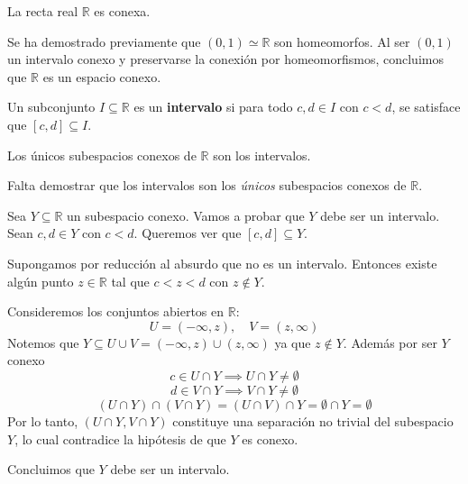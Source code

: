 \begin{teo}
La recta real $\mathbb{R}$ es conexa.
\end{teo}

\begin{dem}
Se ha demostrado previamente que $(0, 1) \simeq \mathbb{R}$ son homeomorfos. Al ser $(0, 1)$ un intervalo conexo y preservarse la conexi\'on por homeomorfismos, concluimos que $\mathbb{R}$ es un espacio conexo.
\end{dem}

\begin{defi}
Un subconjunto $I \subseteq \mathbb{R}$ es un \textbf{intervalo} si para todo $c, d \in I$ con $c < d$, se satisface que $[c, d] \subseteq I$.
\end{defi}

\begin{prop}
Los únicos subespacios conexos de $\mathbb{R}$ son los intervalos.
\end{prop}

\begin{dem}
Falta demostrar que los intervalos son los \emph{únicos} subespacios conexos de $\mathbb{R}$.

Sea $Y \subseteq \mathbb{R}$ un subespacio conexo. Vamos a probar que $Y$ debe ser un intervalo. Sean $c, d \in Y$ con $c < d$. Queremos ver que $[c, d] \subseteq Y$.

Supongamos por reducción al absurdo que no es un intervalo. Entonces existe algún punto $z \in \mathbb{R}$ tal que $c < z < d$ con $z \notin Y$. 

Consideremos los conjuntos abiertos en $\mathbb{R}$:
\[
U = (-\infty, z), \quad V = (z, \infty)
\]
Notemos que $Y \subseteq U \cup V = (-\infty, z) \cup (z, \infty)$ ya que $z \notin Y$. Además por ser $Y$ conexo
\[
c \in U \cap Y \implies U \cap Y \neq \emptyset
\]
\[
d \in V \cap Y \implies V \cap Y \neq \emptyset
\]
\[
(U \cap Y) \cap (V \cap Y) = (U \cap V) \cap Y = \emptyset \cap Y = \emptyset
\]
Por lo tanto, $(U \cap Y, V \cap Y)$ constituye una separación no trivial del subespacio $Y$, lo cual contradice la hipótesis de que $Y$ es conexo.

Concluimos que $Y$ debe ser un intervalo.
\end{dem}
